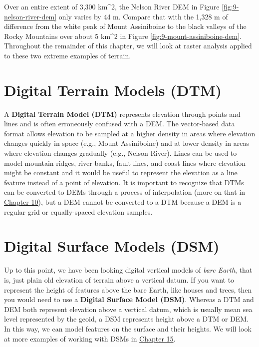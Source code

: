 \documentclass[
]{book}
\begin{document}
Over an entire extent of 3,300 km\^{}2, the Nelson River DEM in Figure \ref{fig:9-nelson-river-dem} only varies by 44 m. Compare that with the 1,328 m of difference from the white peak of Mount Assiniboine to the black valleys of the Rocky Mountains over about 5 km\^{}2 in Figure \ref{fig:9-mount-assiniboine-dem}. Throughout the remainder of this chapter, we will look at raster analysis applied to these two extreme examples of terrain.

\hypertarget{digital-terrain-models-dtm}{%
\section{Digital Terrain Models (DTM)}\label{digital-terrain-models-dtm}}

A \textbf{Digital Terrain Model (DTM)} represents elevation through points and lines and is often erroneously confused with a DEM. The vector-based data format allows elevation to be sampled at a higher density in areas where elevation changes quickly in space (e.g., Mount Assiniboine) and at lower density in areas where elevation changes gradually (e.g., Nelson River). Lines can be used to model mountain ridges, river banks, fault lines, and coast lines where elevation might be constant and it would be useful to represent the elevation as a line feature instead of a point of elevation. It is important to recognize that DTMs can be converted to DEMs through a process of interpolation (more on that in \href{https://ubc-geomatics-textbook.github.io/geomatics-textbook/spatial-estimation.html}{Chapter 10}), but a DEM cannot be converted to a DTM because a DEM is a regular grid or equally-spaced elevation samples.

\hypertarget{digital-surface-models-dsm}{%
\section{Digital Surface Models (DSM)}\label{digital-surface-models-dsm}}

Up to this point, we have been looking digital vertical models of \emph{bare Earth}, that is, just plain old elevation of terrain above a vertical datum. If you want to represent the height of features above the bare Earth, like houses and trees, then you would need to use a \textbf{Digital Surface Model (DSM)}. Whereas a DTM and DEM both represent elevation above a vertical datum, which is usually mean sea level represented by the geoid, a DSM represents height above a DTM or DEM. In this way, we can model features on the surface and their heights. We will look at more examples of working with DSMs in \href{https://ubc-geomatics-textbook.github.io/geomatics-textbook/LiDAR-acquisition-and-analysis.html}{Chapter 15}.
\end{document}
